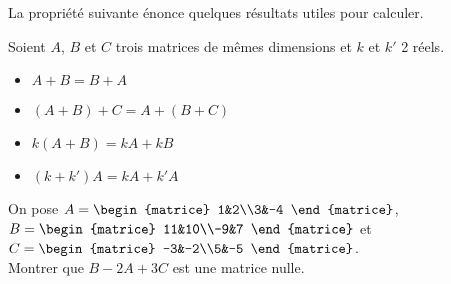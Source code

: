 La propriété suivante énonce quelques résultats utiles pour calculer.
\begin{propriete}
	Soient $A$, $B$ et $C$ trois matrices de mêmes dimensions et $k$ et $k'$ 2 réels.
	\begin{itemize}
		\item 	$A+B = B+A$
		\item 	$(A+B)+C = A+(B+C)$
		\item 	$k(A+B) = kA + kB$
		\item 	$(k+k')A = kA+k'A$
	\end{itemize}
\end{propriete}

\begin{exercice}[]
	On pose $A=\begin{matrice}
			1&2\\3&-4
		\end{matrice}$, $B=\begin{matrice}
			11&10\\-9&7
		\end{matrice}$ et $C=\begin{matrice}
			-3&-2\\5&-5
		\end{matrice}$.\\
	
	Montrer que $B-2A+3C$ est une matrice nulle.
\end{exercice}

